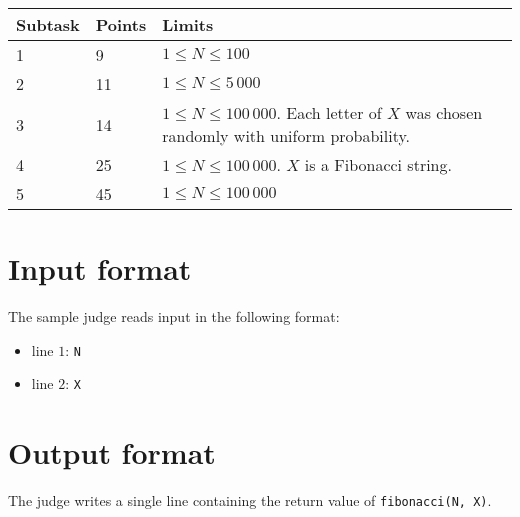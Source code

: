 \begin{tabular}{|l|l|l|}
  \hline
  \textbf{Subtask} & \textbf{Points} & \textbf{Limits} \\ \hline
  1 & 9 & $1 \le N \le 100$  \\ \hline
  2 & 11 & $1 \le N \le 5\,000$  \\ \hline
  3 & 14 & $1 \le N \le 100\,000$. Each letter of $X$ was chosen randomly with uniform probability.  \\ \hline
  4 & 25 & $1 \le N \le 100\,000$. $X$ is a Fibonacci string.  \\ \hline
  5 & 45 & $1 \le N \le 100\,000$  \\ \hline

\end{tabular}

\section*{Input format}
The sample judge reads input in the following format:

\begin{itemize}
  \item line $1$: \texttt{N}
  \item line $2$: \texttt{X}
\end{itemize}

\section*{Output format}
The judge writes a single line containing the return value of \texttt{fibonacci(N, X)}.
